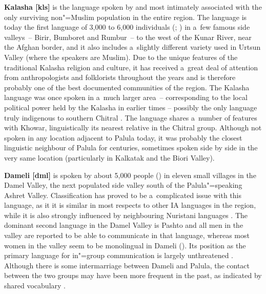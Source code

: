 \textbf{Kalasha [kls]} is the language spoken by and most intimately associated with the only surviving non"=Muslim population in the entire region. The language is today the first language of 3,000 to 6,000 individuals (\citealt[xi]{trailcooper1999}; \citealt[8]{heegardpetersen2006}) in a~few famous side valleys~-- Birir, Bumboret and Rumbur~-- to the west of the Kunar River, near the Afghan border, and it also includes a~slightly different variety used in Urtsun Valley (where the speakers are Muslim). Due to the unique features of the traditional Kalasha religion and culture, it has received a~great deal of attention from anthropologists and folklorists throughout the years and is therefore probably one of the best documented communities of the region. The Kalasha language was once spoken in a~much larger area~-- corresponding to the local political power held by the Kalasha in earlier times \citep[33]{siiger1956} -- possibly the only language truly indigenous to southern Chitral \citep{strand2001}. The language shares a~number of features with Khowar, linguistically its nearest relative in the Chitral group. Although not spoken in any location adjacent to Palula today, it was probably the closest linguistic neighbour of Palula for centuries, sometimes spoken side by side in the very same location (particularly in Kalkatak and the Biori Valley).


\textbf{Dameli [dml]} is spoken by about 5,000 people (\citealt[118]{decker1992a}) in eleven small villages in the Damel Valley, the next populated side valley south of the Palula"=speaking Ashret Valley. Classification has proved to be a~complicated issue with this language, as it it is similar in most respects to other IA languages in the region, while it is also strongly influenced by neighbouring Nuristani languages \citep[254]{strand2001}. The dominant second language in the Damel Valley is Pashto and all men in the valley are reported to be able to communicate in that language, whereas most women in the valley seem to be monolingual in Dameli (\citealt{decker1992a}). Its position as the primary language for in"=group communication is largely unthreatened \citep[7]{perder2013}. Although there is some intermarriage between Dameli and Palula, the contact between the two groups may have been more frequent in the past, as indicated by shared vocabulary \citep[59--60]{morgenstierne1932}.


